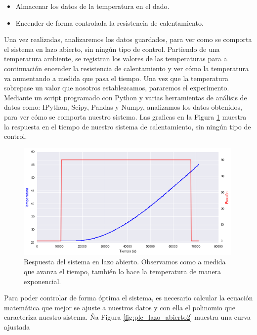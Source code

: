 \begin{itemize}
    \item{Almacenar los datos de la temperatura en el dado.}
    \item{Encender de forma controlada la resistencia de calentamiento.}
\end{itemize}

Una vez realizadas, analizaremos los datos guardados, para ver como se comporta el sistema en lazo abierto, sin ningún tipo de control. Partiendo de una temperatura ambiente, se registran los valores de las temperaturas para a continuación encender la resistencia de calentamiento y ver cómo la temperatura va aumentando a medida que pasa el tiempo. Una vez que la temperatura sobrepase un valor que nosotros establezcamos, pararemos el experimento.\\

Mediante un script programado con Python y varias herramientas de análisis de datos como: IPython, Scipy, Pandas y Numpy, analizamos los datos obtenidos, para ver cómo se comporta nuestro sistema. Las graficas en la Figura \ref{fig:plc_lazo_abierto} muestra la respuesta en el tiempo de nuestro sistema de calentamiento, sin ningún tipo de control.

\begin{figure}[H]
    \centering
    \includegraphics[width=0.99\textwidth]{images/PLC/modelado/modelado_9_1.png}
    \caption[Respuesta del sistema en lazo abierto]{Respuesta del sistema en lazo abierto. Observamos como a medida que avanza el tiempo, también lo hace la temperatura de manera exponencial.}
    \label{fig:plc_lazo_abierto}
\end{figure}

Para poder controlar de forma óptima el sistema, es necesario calcular la ecuación matemática que mejor se ajuste a nuestros datos y con ella el polinomio que caracteriza nuestro sistema. Ña Figura \ref{fig:plc_lazo_abierto2} muestra una curva ajustada

